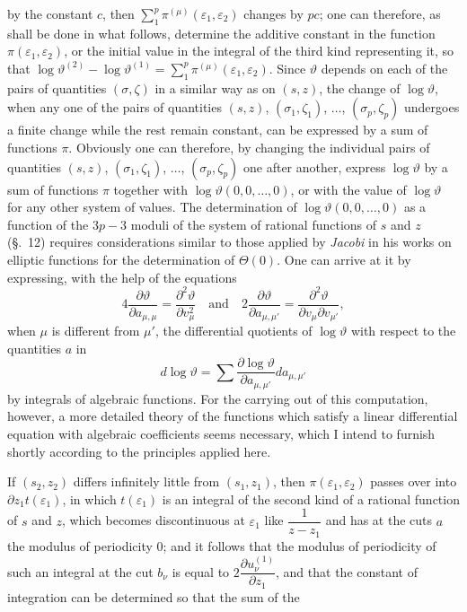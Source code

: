 \documentclass{article}
\begin{document}
by the constant $c$, then $\displaystyle\sum_{1}^{p} \pi^{(\mu)}(\varepsilon_{1}, \varepsilon_{2})$ changes by $pc$; one can therefore, as shall be done in what follows, determine the additive constant in the function $\pi(\varepsilon_{1}, \varepsilon_{2})$, or the initial value in the integral of the third kind representing it, so that $\log\vartheta^{(2)} - \log\vartheta^{(1)} = \displaystyle\sum_{1}^{p} \pi^{(\mu)}(\varepsilon_{1}, \varepsilon_{2})$. Since $\vartheta$ depends on each of the pairs of quantities $(\sigma, \zeta)$ in a similar way as on $(s, z)$, the change of $\log\vartheta$, when any one of the pairs of quantities $(s, z)$, $(\sigma_{1}, \zeta_{1})$, $\ldots$, $(\sigma_{p}, \zeta_{p})$ undergoes a finite change while the rest remain constant, can be expressed by a sum of functions $\pi$. Obviously one can therefore, by changing the individual pairs of quantities $(s, z)$, $(\sigma_{1}, \zeta_{1})$, $\ldots$, $(\sigma_{p}, \zeta_{p})$ one after another, express $\log\vartheta$ by a sum of functions $\pi$ together with $\log\vartheta(0, 0, \ldots, 0)$, or with the value of $\log\vartheta$ for any other system of values. The determination of $\log\vartheta(0, 0, \ldots, 0)$ as a function of the $3p-3$ moduli of the system of rational functions of $s$ and $z$ (§.~12) requires considerations similar to those applied by \emph{Jacobi} in his works on elliptic functions for the determination of $\Theta(0)$. One can arrive at it by expressing, with the help of the equations
\[ 4\frac{\partial\vartheta}{\partial a_{\mu,\mu}} = \frac{\partial^{2}\vartheta}{\partial v_{\mu}^{2}} \quad \text{and} \quad 2\frac{\partial\vartheta}{\partial a_{\mu,\mu'}} = \frac{\partial^{2}\vartheta}{\partial v_{\mu} \partial v_{\mu'}}, \]
when $\mu$ is different from $\mu'$, the differential quotients of $\log\vartheta$ with respect to the quantities $a$ in
\[ d\log\vartheta = \sum \frac{\partial \log\vartheta}{\partial a_{\mu,\mu'}} da_{\mu,\mu'} \]
by integrals of algebraic functions. For the carrying out of this computation, however, a more detailed theory of the functions which satisfy a linear differential equation with algebraic coefficients seems necessary, which I intend to furnish shortly according to the principles applied here.

If $(s_{2}, z_{2})$ differs infinitely little from $(s_{1}, z_{1})$, then $\pi(\varepsilon_{1}, \varepsilon_{2})$ passes over into $\partial z_{1} t(\varepsilon_{1})$, in which $t(\varepsilon_{1})$ is an integral of the second kind of a rational function of $s$ and $z$, which becomes discontinuous at $\varepsilon_{1}$ like $\dfrac{1}{z-z_{1}}$ and has at the cuts $a$ the modulus of periodicity 0; and it follows that the modulus of periodicity of such an integral at the cut $b_{\nu}$ is equal to $2\dfrac{\partial u_{\nu}^{(1)}}{\partial z_{1}}$, and that the constant of integration can be determined so that the sum of the
\end{document}
